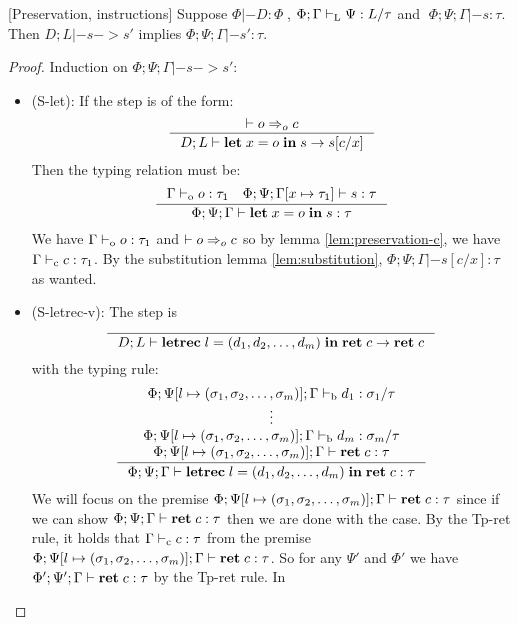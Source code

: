 \documentclass[a4paper, oneside, 10pt, draft]{memoir}
\begin{document}
\begin{lem}{[Preservation, instructions]}
  \label{lem:preservation-i}
  Suppose $\Phi |- D : \Phi \;$, $\Phi;\Gamma |-_{\mathrm{L}} \Psi : L / \tau$ and
  $\; \Phi;\Psi;\Gamma |- s : \tau$. Then $D;L |- s -> s'$ implies
  $\Phi;\Psi;\Gamma |- s' : \tau$.
\end{lem}
\begin{proof}
  Induction on $\Phi;\Psi;\Gamma |- s -> s'$:
  \begin{itemize}
  \item (S-let): If the step is of the form:
    \begin{equation*}
      \inference{|- o \eop c}{D;L |- \ilet{x}{o}{s} -> s[c/x]}
    \end{equation*}
    Then the typing relation must be:
    \begin{equation*}
    \inference{\Gamma \tpop o : \tau_1 \quad \Phi ; \Psi ;
      \Gamma[x \mapsto \tau_1] |- s : \tau}{\Phi ; \Psi ; \Gamma |-
      \ilet{x}{o}{s} : \tau}
    \end{equation*}
    We have $\Gamma |-_{\mathrm{o}} o : \tau_1$ and $|- o =>_{o} c$ so by lemma
    \ref{lem:preservation-c}, we have $\Gamma |-_{\mathrm{c}} c : \tau_1$. By the
    substitution lemma \ref{lem:substitution}, $\Phi;\Psi;\Gamma |-
    s[c/x] : \tau$ as wanted.
  \item (S-letrec-v):
    The step is
    \begin{equation*}
      \inference{}{D;L |- \iletrec{l}{\dbundle}
        {\iret{c}} -> \iret{c}}
    \end{equation*}
    with the typing rule:
    \begin{equation*}
    \inference{\Phi;\Psi[l \mapsto \bbtypes];\Gamma \tpb d_1 :
      \sigma_1 / \tau\\
      \vdots\\
      \Phi;\Psi[l \mapsto \bbtypes];\Gamma \tpb d_m : \sigma_m / \tau\\
      \Phi;\Psi[l \mapsto \bbtypes];\Gamma |- \iret{c} : \tau}
       {\Phi;\Psi;\Gamma |- \iletrec{l}{\dbundle}{\iret{c}} : \tau}
    \end{equation*}
    We will focus on the premise $\Phi;\Psi[l \mapsto (\sigma_1, \sigma_2, \dotsc, \sigma_m)];\Gamma
    |- \mathbf{ret} \; c : \tau$  since if we can show $\Phi;\Psi;\Gamma |-
    \mathbf{ret} \; c : \tau$ then we are done with the case. By the Tp-ret
    rule, it holds that $\Gamma |-_{\mathrm{c}} c : \tau$ from the premise $\Phi;\Psi[l \mapsto (\sigma_1, \sigma_2, \dotsc, \sigma_m)];\Gamma
    |- \mathbf{ret} \; c : \tau$. So for any $\Psi'$ and $\Phi'$ we have
    $\Phi';\Psi';\Gamma |- \mathbf{ret} \; c : \tau$ by the Tp-ret rule. In

\end{itemize}
\end{proof}
\end{document}
